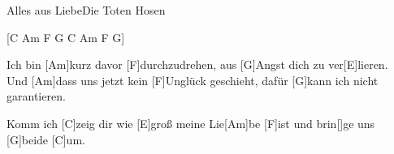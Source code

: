 \begin{song}{Alles aus Liebe}{Die Toten Hosen}
    
    [C Am F G C Am F G]
    
    \begin{bridge}
        Ich bin [Am]kurz davor [F]durchzudrehen,
        aus [G]Angst dich zu ver[E]lieren.\\
        Und [Am]dass uns jetzt kein [F]Unglück geschieht,
        dafür [G]kann ich nicht garantieren.
    \end{bridge}
    
    
    \begin{outro}
        Komm ich [C]zeig dir wie [E]groß meine Lie[Am]be [F]ist
        und brin[]ge uns [G]beide [C]um.
    \end{outro}

\end{song}
